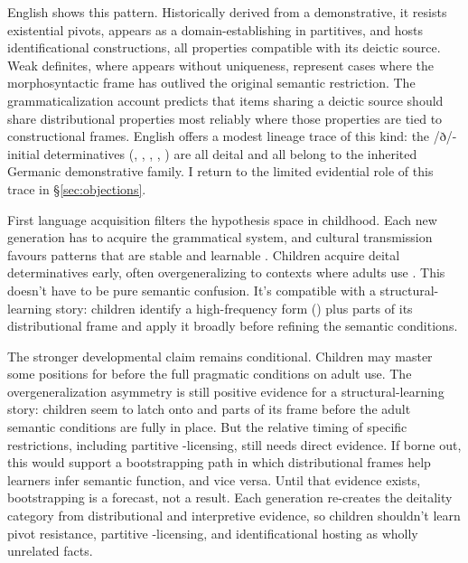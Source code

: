 \documentclass[12pt,letterpaper]{article}
\begin{document}
English  shows this pattern. Historically derived from a demonstrative, it resists existential pivots, appears as a domain-establishing  in partitives, and hosts identificational constructions, all properties compatible with its deictic source. Weak definites, where  appears without uniqueness, represent cases where the morphosyntactic frame has outlived the original semantic restriction. The grammaticalization account predicts that items sharing a deictic source should share distributional properties most reliably where those properties are tied to constructional frames. English offers a modest lineage trace of this kind: the /ð/-initial determinatives (, , , , ) are all deital and all belong to the inherited Germanic demonstrative family. I return to the limited evidential role of this trace in §\ref{sec:objections}.

First language acquisition filters the hypothesis space in childhood. Each new generation has to acquire the grammatical system, and cultural transmission favours patterns that are stable and learnable \parencite{kirby2014}. Children acquire deital determinatives early, often overgeneralizing  to contexts where adults use  \parencite{maratsos1976,rozendaalbaker2008}. This doesn't have to be pure semantic confusion. It's compatible with a structural-learning story: children identify a high-frequency form () plus parts of its distributional frame and apply it broadly before refining the semantic conditions.

The stronger developmental claim remains conditional. Children may master some positions for  before the full pragmatic conditions on adult use. The overgeneralization asymmetry is still positive evidence for a structural-learning story: children seem to latch onto  and parts of its frame before the adult semantic conditions are fully in place. But the relative timing of specific restrictions, including partitive -licensing, still needs direct evidence. If borne out, this would support a bootstrapping path in which distributional frames help learners infer semantic function, and vice versa. Until that evidence exists, bootstrapping is a forecast, not a result. Each generation re-creates the deitality category from distributional and interpretive evidence, so children shouldn't learn pivot resistance, partitive -licensing, and identificational hosting as wholly unrelated facts.
\end{document}
